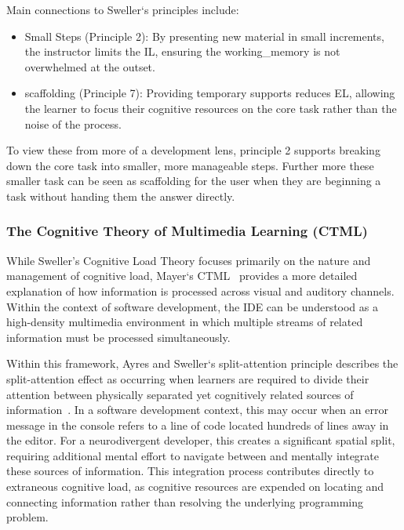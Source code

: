 Main connections to Sweller`s principles include:

\begin{itemize}
    \item Small Steps (Principle 2): By presenting new material in small increments, the instructor limits the \gls{IL}, ensuring the 
    \gls{working_memory} is not overwhelmed at the outset.
    \item \Gls{scaffolding} (Principle 7): Providing temporary supports reduces \gls{EL}, allowing the learner to focus their cognitive 
    resources on the core task rather than the noise of the process.
\end{itemize}

To view these from more of a development lens, principle 2 supports breaking down the core task into smaller, more manageable steps. 
Further more these smaller task can be seen as \gls{scaffolding} for the user when they are beginning a task without handing them the answer directly.


\subsubsection{The Cognitive Theory of Multimedia Learning (CTML)}
While Sweller’s Cognitive Load Theory focuses primarily on the nature and management of cognitive load, Mayer`s \gls{CTML}~\cite{mayer2005cognitive} 
provides a more detailed explanation of how information is processed across visual and auditory channels. Within the context of software development, the
\gls{IDE} can be understood as a high-density multimedia environment in which multiple streams of related information must be processed simultaneously.

Within this framework, Ayres and Sweller`s split-attention principle describes the split-attention effect as occurring when learners are required to divide their attention 
between physically separated yet cognitively related sources of information~\cite{AyresSweller2021}. In a software development context, this may occur when an error message 
in the console refers to a line of code located hundreds of lines away in the editor. For a \gls{neurodivergent} developer, this creates a significant spatial split, requiring 
additional mental effort to navigate between and mentally integrate these sources of information. This integration process contributes directly to extraneous cognitive load, 
as cognitive resources are expended on locating and connecting information rather than resolving the underlying programming problem.

